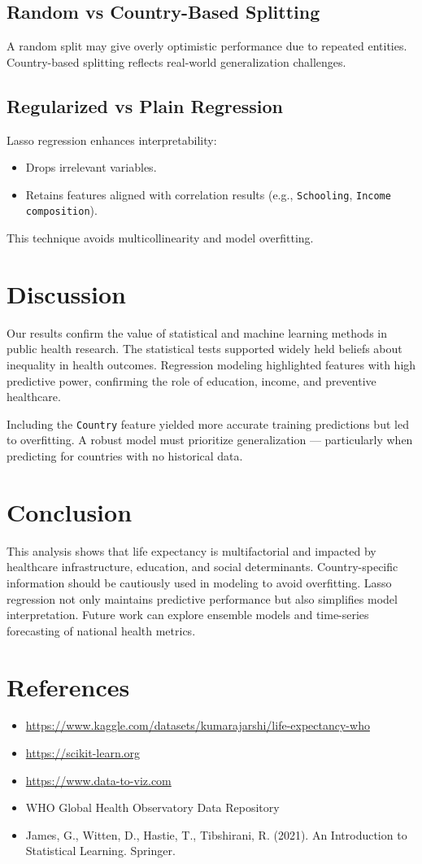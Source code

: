 \documentclass[11pt]{article}
\begin{document}
\subsection{Random vs Country-Based Splitting}
A random split may give overly optimistic performance due to repeated entities. Country-based splitting reflects real-world generalization challenges.

\subsection{Regularized vs Plain Regression}
Lasso regression enhances interpretability:
\begin{itemize}
    \item Drops irrelevant variables.
    \item Retains features aligned with correlation results (e.g., \texttt{Schooling}, \texttt{Income composition}).
\end{itemize}
This technique avoids multicollinearity and model overfitting.

\section{Discussion}
Our results confirm the value of statistical and machine learning methods in public health research. The statistical tests supported widely held beliefs about inequality in health outcomes. Regression modeling highlighted features with high predictive power, confirming the role of education, income, and preventive healthcare.

Including the \texttt{Country} feature yielded more accurate training predictions but led to overfitting. A robust model must prioritize generalization — particularly when predicting for countries with no historical data.

\section{Conclusion}
This analysis shows that life expectancy is multifactorial and impacted by healthcare infrastructure, education, and social determinants. Country-specific information should be cautiously used in modeling to avoid overfitting. Lasso regression not only maintains predictive performance but also simplifies model interpretation. Future work can explore ensemble models and time-series forecasting of national health metrics.

\section*{References}
\begin{itemize}
    \item \url{https://www.kaggle.com/datasets/kumarajarshi/life-expectancy-who}
    \item \url{https://scikit-learn.org}
    \item \url{https://www.data-to-viz.com}
    \item WHO Global Health Observatory Data Repository
    \item James, G., Witten, D., Hastie, T., Tibshirani, R. (2021). An Introduction to Statistical Learning. Springer.
\end{itemize}
\end{document}
